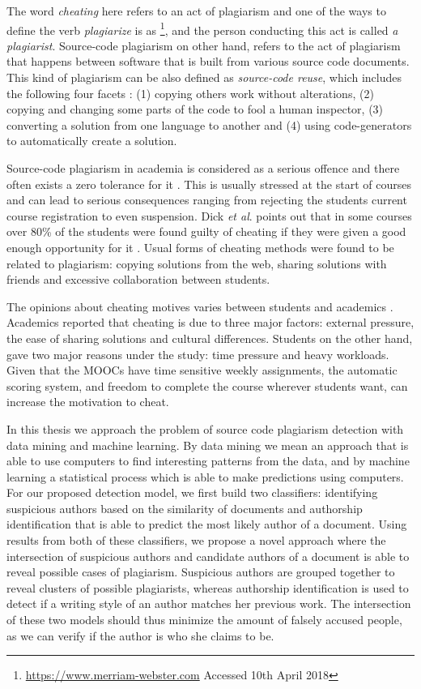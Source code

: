 \documentclass[english, grading]{tktltiki2}
\newcommand{\etal}{\textit{et al}. }
\theoremstyle{definition}
\theoremstyle{remark}
\numberwithin{equation}{section} %
\begin{document}
The word \emph{cheating} here refers to an act of plagiarism and one of the ways to define the verb \emph{plagiarize} is as \footnote{\url{https://www.merriam-webster.com} Accessed 10th April 2018}, and the person conducting this act is called \emph{a plagiarist}. Source-code plagiarism on other hand, refers to the act of plagiarism that happens between software that is built from various source code documents. This kind of plagiarism can be also defined as \emph{source-code reuse}, which includes the following four facets \cite{TDSCP2008}: (1) copying others work without alterations, (2) copying and changing some parts of the code to fool a human inspector, (3) converting a solution from one language to another and (4) using code-generators to automatically create a solution. 


Source-code plagiarism in academia is considered as a serious offence and there often exists a zero tolerance for it \cite{TDSCP2008}. This is usually stressed at the start of courses and can lead to serious consequences ranging from rejecting the students current course registration to even suspension. Dick \etal points out that in some courses over 80\% of the students were found guilty of cheating if they were given a good enough opportunity for it \cite{Dick:2002:ASC:782941.783000}. Usual forms of cheating methods were found to be related to plagiarism: copying solutions from the web, sharing solutions with friends and excessive collaboration between students. 

The opinions about cheating motives varies between students and academics \cite{TDSCP2008}. Academics reported that cheating is due to three major factors: external pressure, the ease of sharing solutions and cultural differences. Students on the other hand, gave two major reasons under the study: time pressure and heavy workloads. Given that the MOOCs have time sensitive weekly assignments, the automatic scoring system, and freedom to complete the course wherever students want, can increase the motivation to cheat.

In this thesis we approach the problem of source code plagiarism detection with data mining and machine learning. By data mining we mean an approach that is able to use computers to find interesting patterns from the data, and by machine learning a statistical process which is able to make predictions using computers. For our proposed detection model, we first build two classifiers: identifying suspicious authors based on the similarity of documents and authorship identification that is able to predict the most likely author of a document. Using results from both of these classifiers, we propose a novel approach where the intersection of suspicious authors and candidate authors of a document is able to reveal possible cases of plagiarism. Suspicious authors are grouped together to reveal clusters of possible plagiarists, whereas authorship identification is used to detect if a writing style of an author matches her previous work. The intersection of these two models should thus minimize the amount of falsely accused people, as we can verify if the author is who she claims to be.  
\end{document}
